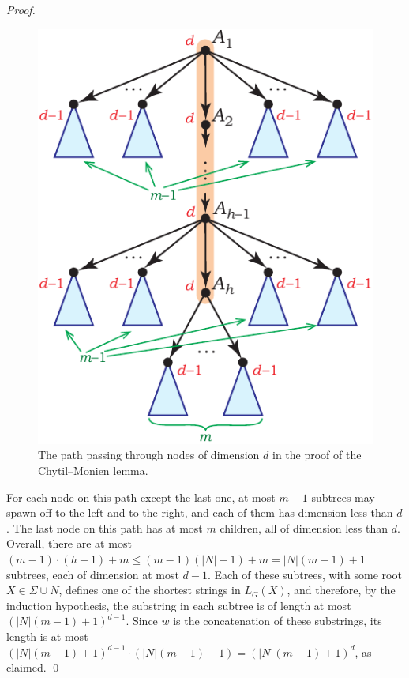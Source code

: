 \documentclass[runningheads]{llncs}
\begin{document}
\begin{proof}
\begin{figure}[t]
\centering
\includegraphics[scale=0.9]{chytil_monien_main_path}
\caption{The path passing through nodes of dimension $d$ in the proof of the Chytil--Monien lemma.}
\label{f:chytil_monien_main_path}
\end{figure}

For each node on this path except the last one,
at most $m-1$ subtrees
may spawn off to the left and to the right,
and each of them has dimension less than $d$.
The last node on this path has at most $m$ children, all of dimension less than $d$.
Overall, there are at most $(m-1) \cdot (h-1) + m \leqslant (m-1)(|N|-1)+m = |N|(m-1) + 1$ subtrees,
each of dimension at most $d-1$.
Each of these subtrees, with some root $X \in \Sigma \cup N$,
defines one of the shortest strings in $L_G(X)$,
and therefore, by the induction hypothesis,
the substring in each subtree is of length at most $(|N|(m-1) + 1)^{d-1}$.
Since $w$ is the concatenation of these substrings,
its length is at most $(|N|(m-1) + 1)^{d-1} \cdot (|N|(m-1) + 1) = (|N|(m-1) + 1)^d$,
as claimed.
\qed
\end{proof}
\end{document}
